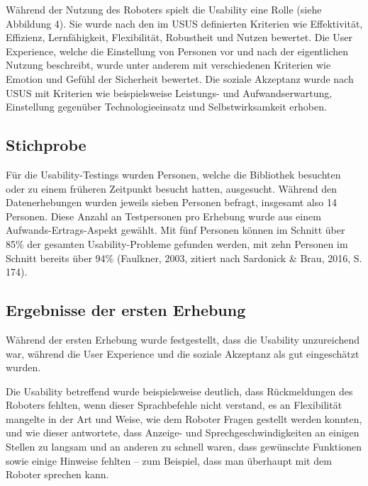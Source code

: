 \documentclass[a4paper,
fontsize=11pt,
oneside,
numbers=noperiodatend,
parskip=half-,
bibliography=totoc,
final
]{scrartcl}
\begin{document}
Während der Nutzung des Roboters spielt die Usability eine Rolle (siehe
Abbildung 4). Sie wurde nach den im USUS definierten Kriterien wie
Effektivität, Effizienz, Lernfähigkeit, Flexibilität, Robustheit und
Nutzen bewertet. Die User Experience, welche die Einstellung von
Personen vor und nach der eigentlichen Nutzung beschreibt, wurde unter
anderem mit verschiedenen Kriterien wie Emotion und Gefühl der
Sicherheit bewertet. Die soziale Akzeptanz wurde nach USUS mit Kriterien
wie beispielsweise Leistungs- und Aufwandserwartung, Einstellung
gegenüber Technologieeinsatz und Selbstwirksamkeit erhoben.

\hypertarget{stichprobe}{%
\subsection{Stichprobe}\label{stichprobe}}

Für die Usability-Testings wurden Personen, welche die Bibliothek
besuchten oder zu einem früheren Zeitpunkt besucht hatten, ausgesucht.
Während den Datenerhebungen wurden jeweils sieben Personen befragt,
insgesamt also 14 Personen. Diese Anzahl an Testpersonen pro Erhebung
wurde aus einem Aufwands-Ertrags-Aspekt gewählt. Mit fünf Personen
können im Schnitt über 85\% der gesamten Usability-Probleme gefunden
werden, mit zehn Personen im Schnitt bereits über 94\% (Faulkner, 2003,
zitiert nach Sardonick \& Brau, 2016, S. 174).

\hypertarget{ergebnisse-der-ersten-erhebung}{%
\subsection{Ergebnisse der ersten Erhebung}\label{ergebnisse-der-ersten-erhebung}}

Während der ersten Erhebung wurde festgestellt, dass die Usability
unzureichend war, während die User Experience und die soziale Akzeptanz
als gut eingeschätzt wurden.

Die Usability betreffend wurde beispielsweise deutlich, dass
Rückmeldungen des Roboters fehlten, wenn dieser Sprachbefehle nicht
verstand, es an Flexibilität mangelte in der Art und Weise, wie dem
Roboter Fragen gestellt werden konnten, und wie dieser antwortete, dass
Anzeige- und Sprechgeschwindigkeiten an einigen Stellen zu langsam und
an anderen zu schnell waren, dass gewünschte Funktionen sowie einige
Hinweise fehlten -- zum Beispiel, dass man überhaupt mit dem Roboter
sprechen kann.
\end{document}
